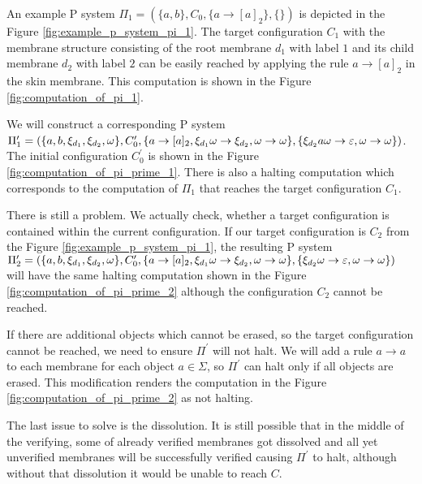 \begin{example}
  An example P system $\Pi_1 = (\{a,b\}, C_0, \{a\rightarrow [a]_2\}, \{\})$ is depicted in the Figure \ref{fig:example_p_system_pi_1}. The target configuration $C_1$ with the membrane structure consisting of the root membrane $d_1$ with label $1$ and its child membrane $d_2$ with label $2$ can be easily reached by applying the rule $a\rightarrow [a]_2$ in the skin membrane. This computation is shown in the Figure \ref{fig:computation_of_pi_1}.

  We will construct a corresponding P system $\Pi^\prime_1=(\{a,b,\xi_{d_1},\xi_{d_2},\omega\}, C^\prime_0, \linebreak\{a\rightarrow [a]_2,\xi_{d_1}\omega\rightarrow\xi_{d_2},\omega\rightarrow\omega\}, \{\xi_{d_2}a\omega\rightarrow\eps,\omega\rightarrow\omega\})$. The initial configuration $C^\prime_0$ is shown in the Figure \ref{fig:computation_of_pi_prime_1}. There is also a halting computation which corresponds to the computation of $\Pi_1$ that reaches the target configuration $C_1$.
\end{example}

\begin{example}
There is still a problem. We actually check, whether a target configuration is contained within the current configuration. If our target configuration is $C_2$ from the Figure \ref{fig:example_p_system_pi_1}, the resulting P system $\Pi^\prime_2=(\{a,b,\xi_{d_1},\xi_{d_2},\omega\}, C^\prime_0, \{a\rightarrow [a]_2,\xi_{d_1}\omega\rightarrow\xi_{d_2},\omega\rightarrow\omega\}, \{\xi_{d_2}\omega\rightarrow\varepsilon,\omega\rightarrow\omega\})$ will have the same halting computation shown in the Figure \ref{fig:computation_of_pi_prime_2} although the configuration $C_2$ cannot be reached.  
\end{example}

If there are additional objects which cannot be erased, so the target configuration cannot be reached, we need to ensure $\Pi^\prime$ will not halt. We will add a rule $a\rightarrow a$ to each membrane for each object $a\in\Sigma$, so $\Pi^\prime$ can halt only if all objects are erased. This modification renders the computation in the Figure \ref{fig:computation_of_pi_prime_2} as not halting.

The last issue to solve is the dissolution. It is still possible that in the middle of the verifying, some of already verified membranes got dissolved and all yet unverified membranes will be successfully verified causing $\Pi^\prime$ to halt, although without that dissolution it would be unable to reach $C$.

